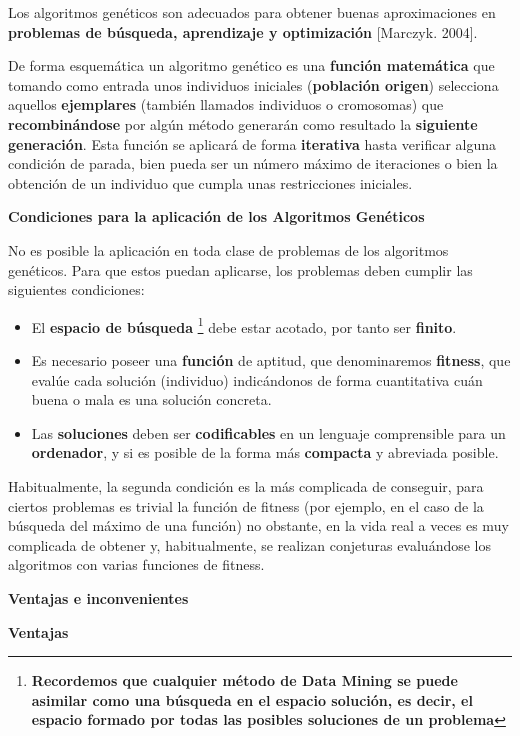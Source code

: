 \documentclass[
  a4paper,
  DIV=11,
  numbers=noendperiod]{scrreprt}
\begin{document}
Los algoritmos genéticos son adecuados para obtener buenas
aproximaciones en \textbf{problemas de búsqueda, aprendizaje y
optimización} {[}Marczyk. 2004{]}.

De forma esquemática un algoritmo genético es una \textbf{función
matemática} que tomando como entrada unos individuos iniciales
(\textbf{población origen}) selecciona aquellos \textbf{ejemplares}
(también llamados individuos o cromosomas) que \textbf{recombinándose}
por algún método generarán como resultado la \textbf{siguiente
generación}. Esta función se aplicará de forma \textbf{iterativa} hasta
verificar alguna condición de parada, bien pueda ser un número máximo de
iteraciones o bien la obtención de un individuo que cumpla unas
restricciones iniciales.

\textbf{Condiciones para la aplicación de los Algoritmos Genéticos}

No es posible la aplicación en toda clase de problemas de los algoritmos
genéticos. Para que estos puedan aplicarse, los problemas deben cumplir
las siguientes condiciones:

\begin{itemize}
\item
  El \textbf{espacio de búsqueda} \footnote{\textbf{Recordemos que
    cualquier método de Data Mining se puede asimilar como una búsqueda
    en el espacio solución, es decir, el espacio formado por todas las
    posibles soluciones de un problema}} debe estar acotado, por tanto
  ser \textbf{finito}.
\item
  Es necesario poseer una \textbf{función} de aptitud, que denominaremos
  \textbf{fitness}, que evalúe cada solución (individuo) indicándonos de
  forma cuantitativa cuán buena o mala es una solución concreta.
\item
  Las \textbf{soluciones} deben ser \textbf{codificables} en un lenguaje
  comprensible para un \textbf{ordenador}, y si es posible de la forma
  más \textbf{compacta} y abreviada posible.
\end{itemize}

Habitualmente, la segunda condición es la más complicada de conseguir,
para ciertos problemas es trivial la función de fitness (por ejemplo, en
el caso de la búsqueda del máximo de una función) no obstante, en la
vida real a veces es muy complicada de obtener y, habitualmente, se
realizan conjeturas evaluándose los algoritmos con varias funciones de
fitness.

\textbf{Ventajas e inconvenientes}

\textbf{Ventajas}
\end{document}
